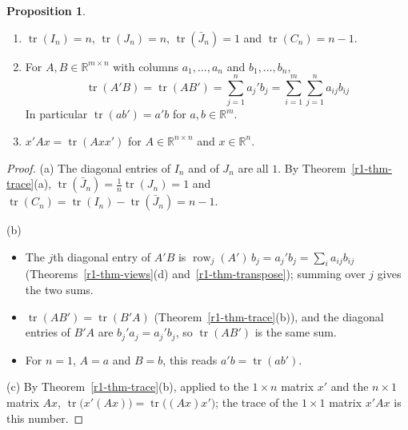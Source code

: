 \documentclass[12pt]{article}
\newcommand{\R}{\mathbb R}
\DeclareMathOperator{\tr}{tr}
\DeclareMathOperator{\row}{row}
\theoremstyle{definition}
\newtheorem{proposition}[theorem]{Proposition}
\begin{document}
\begin{proposition}\label{r1-prop-trace-more}
\begin{enumerate}
\item \(\tr(I_n)=n\), \(\tr(J_n)=n\), \(\tr(\bar J_n)=1\) and \(\tr(C_n)=n-1\).
\item For \(A,B\in\R^{m\times n}\) with columns \(a_1,\dots,a_n\) and \(b_1,\dots,b_n\),
\[
\tr(A'B)=\tr(AB')=\sum_{j=1}^na_j'b_j=\sum_{i=1}^m\sum_{j=1}^na_{ij}b_{ij}
\]
In particular \(\tr(ab')=a'b\) for \(a,b\in\R^m\).
\item \(x'Ax=\tr(Axx')\) for \(A\in\R^{n\times n}\) and \(x\in\R^n\).
\end{enumerate}
\end{proposition}
\begin{proof}
(a) The diagonal entries of \(I_n\) and of \(J_n\) are all \(1\). By Theorem~\ref{r1-thm-trace}(a),
\(\tr(\bar J_n)=\frac1n\tr(J_n)=1\) and \(\tr(C_n)=\tr(I_n)-\tr(\bar J_n)=n-1\).

(b)
\begin{itemize}
\item The \(j\)th diagonal entry of \(A'B\) is \(\row_j(A')\,b_j=a_j'b_j=\sum_ia_{ij}b_{ij}\)
(Theorems~\ref{r1-thm-views}(d) and~\ref{r1-thm-transpose}); summing over \(j\) gives the two sums.
\item \(\tr(AB')=\tr(B'A)\) (Theorem~\ref{r1-thm-trace}(b)), and the diagonal entries of \(B'A\) are
\(b_j'a_j=a_j'b_j\), so \(\tr(AB')\) is the same sum.
\item For \(n=1\), \(A=a\) and \(B=b\), this reads \(a'b=\tr(ab')\).
\end{itemize}
(c) By Theorem~\ref{r1-thm-trace}(b), applied to the \(1\times n\) matrix \(x'\) and the \(n\times1\) matrix \(Ax\),
\(\tr\bigl(x'(Ax)\bigr)=\tr\bigl((Ax)x'\bigr)\); the trace of the \(1\times1\) matrix \(x'Ax\) is this number.
\end{proof}
\end{document}
